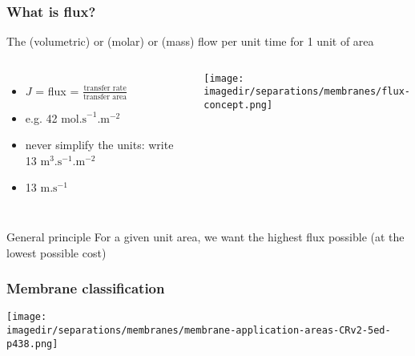 \begin{frame}\frametitle{What is flux?}
	\begin{exampleblock}{}
		\centering
		\small The (volumetric) or (molar) or (mass) flow per unit time for 1 unit of area
	\end{exampleblock}
	\vspace{12pt}
	\begin{columns}[t]
			\begin{itemize}
				\item	$J$ = flux = $\displaystyle \frac{\text{transfer rate}}{\text{transfer area}}$
				\item	e.g. 42 $\text{mol.s}^{-1}\text{.m}^{-2}$
				\item	never simplify the units: write 13 $\text{m}^3.\text{s}^{-1}\text{.m}^{-2}$
				\item	{\color{myRed}{do not write}} 13 $\text{m}\text{.s}^{-1}$
			\end{itemize}
			\begin{center}
				\texttt{[image: \\imagedir/separations/membranes/flux-concept.png]}
			\end{center}
	\end{columns}
	\begin{exampleblock}{General principle}
		For a given unit area, we want the highest flux possible (at the lowest possible cost)
	\end{exampleblock}	
\end{frame}

\begin{frame}\frametitle{Membrane classification}
	
	\begin{center}
		\texttt{[image: \\imagedir/separations/membranes/membrane-application-areas-CRv2-5ed-p438.png]}
	\end{center}
	
\end{frame}

